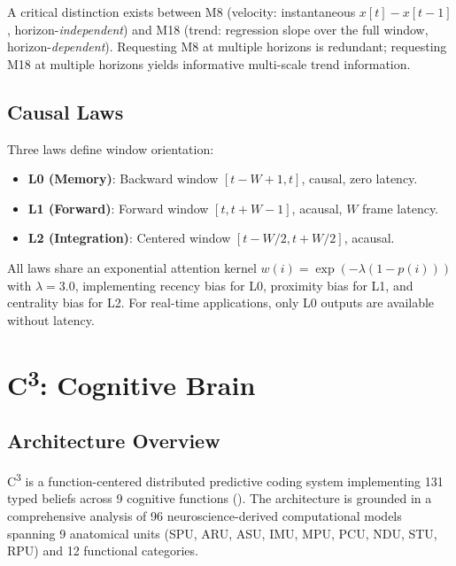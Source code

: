\documentclass[10pt,twocolumn]{article}
\newcommand{\Ccube}{C\textsuperscript{3}}
\begin{document}
A critical distinction exists between M8 (velocity: instantaneous $x[t] - x[t-1]$, horizon-\emph{independent}) and M18 (trend: regression slope over the full window, horizon-\emph{dependent}).
Requesting M8 at multiple horizons is redundant; requesting M18 at multiple horizons yields informative multi-scale trend information.

\subsection{Causal Laws}

Three laws define window orientation:
\begin{itemize}[leftmargin=*,nosep]
    \item \textbf{L0 (Memory)}: Backward window $[t-W+1, t]$, causal, zero latency.
    \item \textbf{L1 (Forward)}: Forward window $[t, t+W-1]$, acausal, $W$ frame latency.
    \item \textbf{L2 (Integration)}: Centered window $[t-W/2, t+W/2]$, acausal.
\end{itemize}

All laws share an exponential attention kernel $w(i) = \exp(-\lambda(1 - p(i)))$ with $\lambda = 3.0$, implementing recency bias for L0, proximity bias for L1, and centrality bias for L2.
For real-time applications, only L0 outputs are available without latency.

\section{C\textsuperscript{3}: Cognitive Brain}
\label{sec:c3}

\subsection{Architecture Overview}

\Ccube{} is a function-centered distributed predictive coding system implementing 131 typed beliefs across 9 cognitive functions ().
The architecture is grounded in a comprehensive analysis of 96 neuroscience-derived computational models spanning 9 anatomical units (SPU, ARU, ASU, IMU, MPU, PCU, NDU, STU, RPU) and 12 functional categories.
\end{document}
